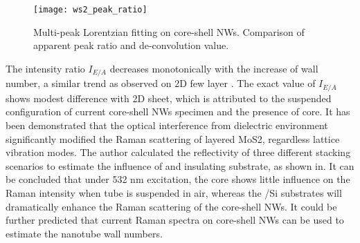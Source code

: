 \begin{figure}[htb]
\centering
\texttt{[image: ws2\_peak\_ratio]}
\caption[Multi-peak Lorentzian fitting on core-shell NWs]{Multi-peak Lorentzian fitting on core-shell NWs. Comparison of apparent peak ratio and de-convolution value.}
\label{fig:ch5ws2pr}
\end{figure}
The intensity ratio $I_{E/A}$ decreases monotonically with the increase of  wall number, a similar trend as observed on 2D few layer . The exact value of $I_{E/A}$ shows modest difference with 2D sheet, which is attributed to the suspended configuration of current core-shell NWs specimen and the presence of  core. It has been demonstrated that the optical interference from dielectric environment significantly modified the Raman scattering of layered MoS2, regardless lattice vibration modes.\cite{Li2012} The author calculated the reflectivity of three different stacking scenarios to estimate the influence of  and insulating substrate, as shown in. It can be concluded that under 532 nm excitation, the  core shows little influence on the Raman intensity when  tube is suspended in air, whereas the /Si substrates will dramatically enhance the Raman scattering of the core-shell NWs. It could be further predicted that current Raman spectra on core-shell NWs can be used to estimate the  nanotube wall numbers. 

